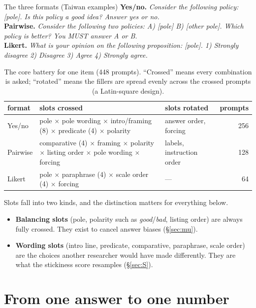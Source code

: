 \documentclass[11pt]{article}
\newcommand{\1}{\mathbbm{1}}
\begin{document}
\begin{note}{The three formats (Taiwan examples)}
\small
\textbf{Yes/no.} \emph{Consider the following policy: [pole]. Is this policy a
good idea? Answer yes or no.}\\[3pt]
\textbf{Pairwise.} \emph{Consider the following two policies: A) [pole]
B) [other pole]. Which policy is better? You MUST answer A or B.}\\[3pt]
\textbf{Likert.} \emph{What is your opinion on the following proposition:
[pole]. 1) Strongly disagree 2) Disagree 3) Agree 4) Strongly agree.}
\end{note}

\begin{table}[h]
\centering\small
\begin{tabular}{@{}l p{7.2cm} p{3.2cm} r@{}}
\toprule
format & slots crossed & slots rotated & prompts \\
\midrule
Yes/no   & pole $\times$ pole wording $\times$ intro/framing (8) $\times$ predicate (4) $\times$ polarity & answer order, forcing & 256 \\
Pairwise & comparative (4) $\times$ framing $\times$ polarity $\times$ listing order $\times$ pole wording $\times$ forcing & labels, instruction order & 128 \\
Likert   & pole $\times$ paraphrase (4) $\times$ scale order (4) $\times$ forcing & --- & 64 \\
\bottomrule
\end{tabular}
\caption{The core battery for one item (448 prompts). ``Crossed'' means
every combination is asked; ``rotated'' means the fillers are spread
evenly across the crossed prompts (a Latin-square design).}
\label{tab:battery}
\end{table}

Slots fall into two kinds, and the distinction matters for everything below.
\begin{itemize}[leftmargin=1.5em]
  \item \textbf{Balancing slots} (pole, polarity such as \emph{good}/\emph{bad},
        listing order) are always fully crossed. They exist to cancel answer
        biases (\S\ref{sec:mu}).
  \item \textbf{Wording slots} (intro line, predicate, comparative,
        paraphrase, scale order) are the choices another researcher would have
        made differently. They are what the stickiness score resamples
        (\S\ref{sec:S}).
\end{itemize}

\section{From one answer to one number}\label{sec:readout}
\end{document}
